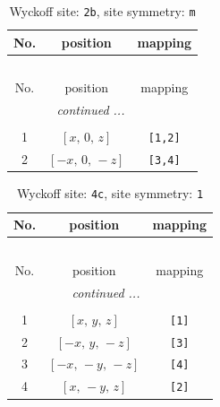 \documentclass[fleqn,8pt]{jsarticle}
\begin{document}
\begin{longtable}{ccc}
\caption{Wyckoff site: {\tt 2b}, site symmetry: {\tt m}}
 \\
 \hline \hline
No. & position & mapping \\ \hline \endfirsthead

\multicolumn{2}{l}{\tablename\ \thetable{}} \\
 \hline \hline
No. & position & mapping \\ \hline \endhead

 \hline \hline
\multicolumn{2}{r}{\footnotesize\it continued ...} \\ \endfoot

 \hline \hline
\multicolumn{2}{r}{} \\ \endlastfoot

1 & $\left[ x,\, 0,\, z \right]$ & {\tt [1,2]} \\ \hline
2 & $\left[ - x,\, 0,\, - z \right]$ & {\tt [3,4]} \\
\end{longtable}
\renewcommand{\arraystretch}{1.2}
\begin{longtable}{ccc}
\caption{Wyckoff site: {\tt 4c}, site symmetry: {\tt 1}}
 \\
 \hline \hline
No. & position & mapping \\ \hline \endfirsthead

\multicolumn{2}{l}{\tablename\ \thetable{}} \\
 \hline \hline
No. & position & mapping \\ \hline \endhead

 \hline \hline
\multicolumn{2}{r}{\footnotesize\it continued ...} \\ \endfoot

 \hline \hline
\multicolumn{2}{r}{} \\ \endlastfoot

1 & $\left[ x,\, y,\, z \right]$ & {\tt [1]} \\ \hline
2 & $\left[ - x,\, y,\, - z \right]$ & {\tt [3]} \\ \hline
3 & $\left[ - x,\, - y,\, - z \right]$ & {\tt [4]} \\ \hline
4 & $\left[ x,\, - y,\, z \right]$ & {\tt [2]} \\
\end{longtable}
\end{document}

